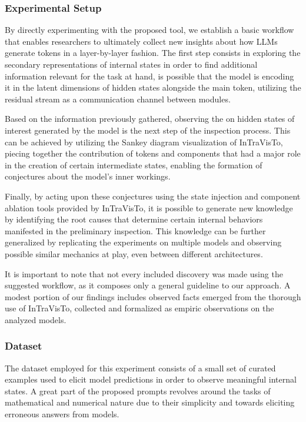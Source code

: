 \subsubsection{Experimental Setup}\label{sssec:exp_intravisto_exp4_expset}

By directly experimenting with the proposed tool, we establish a basic workflow that enables researchers to ultimately collect new insights about how LLMs generate tokens in a layer-by-layer fashion.
The first step consists in exploring the secondary representations of internal states in order to find additional information relevant for the task at hand,  is possible that the model is encoding it in the latent dimensions of hidden states alongside the main token, utilizing the residual stream as a communication channel between modules.

Based on the information previously gathered, observing the  on hidden states of interest generated by the model is the next step of the inspection process.
This can be achieved by utilizing the Sankey diagram visualization of InTraVisTo, piecing together the contribution of tokens and components that had a major role in the creation of certain intermediate states, enabling the formation of conjectures about the model's inner workings.

Finally, by acting upon these conjectures using the state injection and component ablation tools provided by InTraVisTo, it is possible to generate new knowledge by identifying the root causes that determine certain internal behaviors manifested in the preliminary inspection.
This knowledge can be further generalized by replicating the experiments on multiple models and observing possible similar mechanics at play, even between different architectures.

It is important to note that not every included discovery was made using the suggested workflow, as it composes only a general guideline to our approach.
A modest portion of our findings includes observed facts emerged from the thorough use of InTraVisTo, collected and formalized as empiric observations on the analyzed models.

\subsubsection{Dataset}

The dataset employed for this experiment consists of a small set of curated examples used to elicit model predictions in order to observe meaningful internal states.
A great part of the proposed prompts revolves around the  tasks of mathematical and numerical nature due to their simplicity and  towards eliciting erroneous answers from models.

